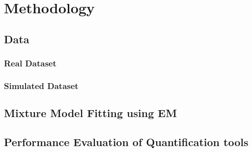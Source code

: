 \chapter{Methodology}
\label{sec:methodology} 

\section{Data}
\label{sec:data}

\subsection{Real Dataset}
\label{sec:realdataset}

\subsection{Simulated Dataset}
\label{sec:simdataset}

\section{Mixture Model Fitting using EM}
\label{sec:modelfitting}

\section{Performance Evaluation of Quantification tools}
\label{sec:performanceeval}
